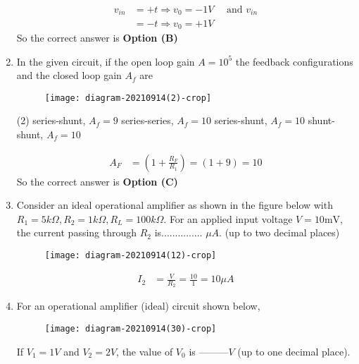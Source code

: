 \begin{enumerate}
\begin{answer}
\begin{align*}
v_{i n}&=+t \Rightarrow v_{0}=-1 V \quad\text{ and }v_{i n}\\&=-t \Rightarrow v_{0}=+1 V
\end{align*}
So the correct answer is \textbf{Option (B)}
\end{answer}
	\item In the given circuit, if the open loop gain $A=10^{5}$ the feedback configurations and the closed loop gain $A_{f}$ are
{	}
\begin{figure}[H]
\centering
\texttt{[image: diagram-20210914(2)-crop]}
\end{figure}
\begin{tasks}(2)
\task[\textbf{A.}] series-shunt, $A_{f}=9$
\task[\textbf{B.}] series-series, $A_{f}=10$
\task[\textbf{C.}] series-shunt, $A_{f}=10$
\task[\textbf{D.}] shunt-shunt, $A_{f}=10$
\end{tasks}
\begin{answer}
\begin{align*}
A_{F}&=\left(1+\frac{R_{F}}{R_{1}}\right)=(1+9)=10
\end{align*}
So the correct answer is \textbf{Option (C)}
\end{answer}
	\item Consider an ideal operational amplifier as shown in the figure below with $R_{1}=5 k \Omega, R_{2}=1 k \Omega, R_{L}=100 k \Omega .$ For an applied input voltage $V=10 \mathrm{mV}$, the current passing through $R_{2}$ is............... $\mu A$. (up to two decimal places)
	{}
\begin{figure}[H]
\centering
\texttt{[image: diagram-20210914(12)-crop]}
\end{figure}
\begin{answer}
\begin{align*}
I_{2}&=\frac{V}{R_{2}}=\frac{10}{1}=10 \mu A
\end{align*}
\end{answer}
	\item For an operational amplifier (ideal) circuit shown below,\\
	\begin{figure}[H]
		\centering
		\texttt{[image: diagram-20210914(30)-crop]}
		\caption{}
		\label{}
	\end{figure}
	If $V_{1}=1 V$ and $V_{2}=2 V$, the value of $V_{0}$ is ---------$V$ (up to one decimal place).
{	}
\begin{answer}
\begin{align*}

\end{align*}
\end{answer}
\end{enumerate}
